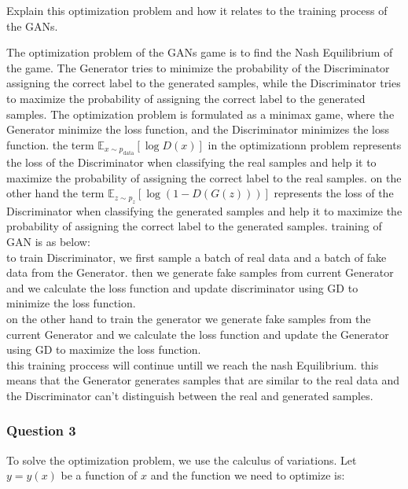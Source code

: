 Explain this optimization problem and how it relates to the training process of the GANs.
\begin{qsolve}
    \begin{qsolve}[]
        The optimization problem of the GANs game is to find the Nash Equilibrium of the game. The Generator tries to minimize the probability of the Discriminator assigning the correct label to the generated samples, while the Discriminator tries to maximize the probability of assigning the correct label to the generated samples. The optimization problem is formulated as a minimax game, where the Generator minimize the loss function, and the Discriminator minimizes the loss function. the term $\mathbb{E}_{x \sim p_{\text{data}}} [\log D(x)]$ in the optimizationn problem represents the loss of the Discriminator when classifying the real samples and help it to maximize the probability of assigning the correct label to the real samples. 
        \splitqsolve[\splitqsolve]
        on the other hand the term $\mathbb{E}_{z \sim p_z} [\log (1 - D(G(z)))]$ represents the loss of the Discriminator when classifying the generated samples and help it to maximize the probability of assigning the correct label to the generated samples. training of GAN is as below:\\
        to train Discriminator, we first sample a batch of real data and a batch of fake data from the Generator. then we generate fake samples from current Generator and we calculate the loss function and update discriminator using GD to minimize the loss function.\\
        on the other hand to train the generator we generate fake samples from the current Generator and we calculate the loss function and update the Generator using GD to maximize the loss function.\\
        this training proccess will continue untill we reach the nash Equilibrium. this means that the Generator generates samples that are similar to the real data and the Discriminator can't distinguish between the real and generated samples.
    \end{qsolve}
\end{qsolve}
\subsubsection{Question 3}

To solve the optimization problem, we use the calculus of variations. Let $y = y(x)$ be a function of $x$ and the function we need to optimize is:

